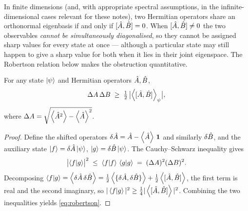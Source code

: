 In finite dimensions (and, with appropriate spectral assumptions,
in the infinite-dimensional cases relevant for these notes), two
Hermitian operators share an orthonormal eigenbasis if and only if
$[\hat{A},\hat{B}]=0$. When $[\hat{A},\hat{B}]\neq0$ the two observables
\emph{cannot be simultaneously diagonalised}, so they cannot be
assigned sharp values for every state at once --- although a
particular state may still happen to give a sharp value for both
when it lies in their joint eigenspace. The Robertson relation
below makes the obstruction quantitative.

\begin{theorem}
\label{thm:robertson}
For any state $\ket{\psi}$ and Hermitian operators $\hat{A},\hat{B}$,
\begin{equation}
\label{eq:robertson}
\Delta A\,\Delta B \;\geq\; \tfrac{1}{2}\,
\bigl|\expval{[\hat{A},\hat{B}]}_\psi\bigr|,
\end{equation}
where $\Delta A=\sqrt{\expval{\hat{A}^2}-\expval{\hat{A}}^2}$.
\end{theorem}

\begin{proof}
Define the shifted operators
$\delta\hat{A}=\hat{A}-\expval{\hat{A}}\,\mathbf{1}$ and similarly
$\delta\hat{B}$, and the auxiliary state
$\ket{f}=\delta\hat{A}\ket{\psi}$,
$\ket{g}=\delta\hat{B}\ket{\psi}$. The Cauchy--Schwarz inequality
gives
\begin{equation}
\bigl|\braket{f}{g}\bigr|^2 \;\leq\; \braket{f}{f}\,\braket{g}{g}
\;=\; (\Delta A)^2(\Delta B)^2.
\end{equation}
Decomposing
$\braket{f}{g}=\expval{\delta\hat{A}\,\delta\hat{B}}=
\tfrac12\expval{\{\delta\hat{A},\delta\hat{B}\}}+\tfrac12\expval{[\hat{A},\hat{B}]}$,
the first term is real and the second imaginary, so
$|\braket{f}{g}|^2\geq\tfrac14|\expval{[\hat{A},\hat{B}]}|^2$.
Combining the two inequalities yields \cref{eq:robertson}.
\end{proof}

